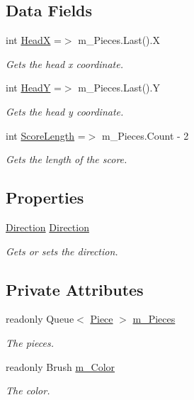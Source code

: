 \subsection*{Data Fields}
\begin{DoxyCompactItemize}
\item 
int \mbox{\hyperlink{class_snake_1_1_snake_a8d02628f982abe0f3ef44adfb1f726f2}{HeadX}} =$>$ m\+\_\+\+Pieces.\+Last().X
\begin{DoxyCompactList}\small\item\em Gets the head x coordinate. \end{DoxyCompactList}\item 
int \mbox{\hyperlink{class_snake_1_1_snake_a89adce0458550b1b51303177af538219}{HeadY}} =$>$ m\+\_\+\+Pieces.\+Last().Y
\begin{DoxyCompactList}\small\item\em Gets the head y coordinate. \end{DoxyCompactList}\item 
int \mbox{\hyperlink{class_snake_1_1_snake_a912fc4449dc3eca0da55238e89ff36aa}{Score\+Length}} =$>$ m\+\_\+\+Pieces.\+Count -\/ 2
\begin{DoxyCompactList}\small\item\em Gets the length of the score. \end{DoxyCompactList}\end{DoxyCompactItemize}
\subsection*{Properties}
\begin{DoxyCompactItemize}
\item 
\mbox{\hyperlink{namespace_snake_a17196bbf1b4636022495ef12635a68f7}{Direction}} \mbox{\hyperlink{class_snake_1_1_snake_a31479cba3049a1e8371170df81c4eb23}{Direction}}
\begin{DoxyCompactList}\small\item\em Gets or sets the direction. \end{DoxyCompactList}\end{DoxyCompactItemize}
\subsection*{Private Attributes}
\begin{DoxyCompactItemize}
\item 
readonly Queue$<$ \mbox{\hyperlink{class_snake_1_1_piece}{Piece}} $>$ \mbox{\hyperlink{class_snake_1_1_snake_a23154b222280aed8648914f592a0be7a}{m\+\_\+\+Pieces}}
\begin{DoxyCompactList}\small\item\em The pieces. \end{DoxyCompactList}\item 
readonly Brush \mbox{\hyperlink{class_snake_1_1_snake_a3d10b9f81a7c8e6e7b8cd9263c018125}{m\+\_\+\+Color}}
\begin{DoxyCompactList}\small\item\em The color. \end{DoxyCompactList}\end{DoxyCompactItemize}


